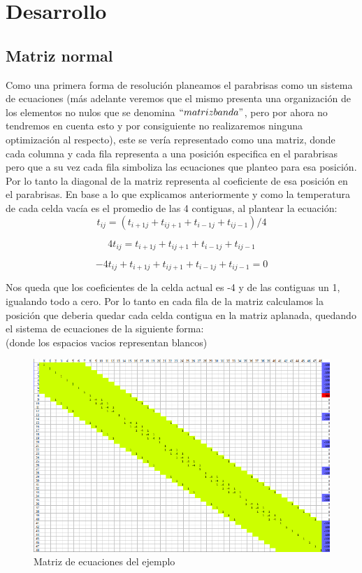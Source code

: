 \section{Desarrollo}

\subsection{Matriz normal}

Como una primera forma de resolución planeamos el parabrisas como un sistema de ecuaciones (más adelante veremos que el mismo presenta una organización de los elementos no nulos que se denomina $``matriz banda"$, pero por ahora no tendremos en cuenta esto y por consiguiente no realizaremos ninguna optimización al respecto), este se vería representado como una matriz, donde cada columna y cada fila representa a una posición especifica en el parabrisas pero que a su vez cada fila simboliza las ecuaciones que planteo para esa posición. Por lo tanto la diagonal de la matriz representa al coeficiente de esa posición en el parabrisas.
En base a lo que explicamos anteriormente y como la temperatura de cada celda vacía es el promedio de las 4 contiguas, al plantear la ecuación: 
\[
t_{ij} = (t_{i+1 j} + t_{i j+1} + t_{i-1 j} + t_{i j-1}) / 4
\]

\[
4 t_{ij} = t_{i+1 j} + t_{i j+1} + t_{i-1 j} + t_{i j-1}
\]

\[
 - 4 t_{ij} + t_{i+1 j} + t_{i j+1} + t_{i-1 j} + t_{i j-1}  = 0
\]

Nos queda que los coeficientes de la celda actual es -4 y de las contiguas un 1, igualando todo a cero.
Por lo tanto en cada fila de la matriz calculamos la posición que deberia quedar cada celda contigua en la matriz aplanada, quedando el sistema de ecuaciones de la siguiente forma: \\
(donde los espacios vacios representan blancos)
\begin{figure}
\begin{center}
\includegraphics[scale=0.60]{imagenes/matrizej.png} 
\caption{Matriz de ecuaciones del ejemplo} 
\end{center}
\end{figure}


